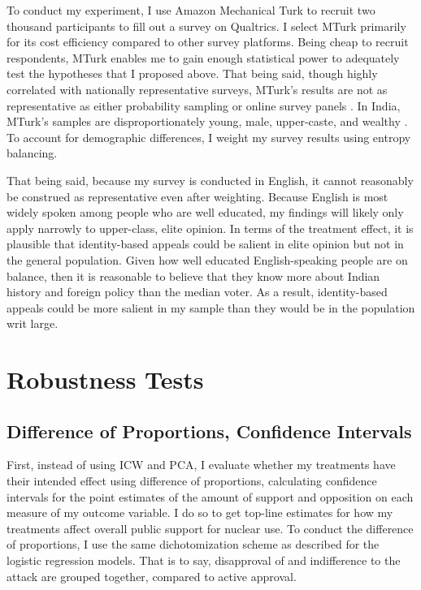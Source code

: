 \documentclass[12pt]{article}
\begin{document}
To conduct my experiment, I use Amazon Mechanical Turk to recruit two thousand participants to fill out a survey on Qualtrics. I select MTurk primarily for its cost efficiency compared to other survey platforms. Being cheap to recruit respondents, MTurk enables me to gain enough statistical power to adequately test the hypotheses that I proposed above. That being said, though highly correlated with nationally representative surveys, MTurk's results are not as representative as either probability sampling or online survey panels \citep{berinsky_evaluating_2012}. In India, MTurk's samples are disproportionately young, male, upper-caste, and wealthy \citep{boas_recruiting_2020}. To account for demographic differences, I weight my survey results using entropy balancing. 

That being said, because my survey is conducted in English, it cannot reasonably be construed as representative even after weighting. Because English is most widely spoken among people who are well educated, my findings will likely only apply narrowly to upper-class, elite opinion. In terms of the treatment effect, it is plausible that identity-based appeals could be salient in elite opinion but not in the general population. Given how well educated English-speaking people are on balance, then it is reasonable to believe that they know more about Indian history and foreign policy than the median voter. As a result, identity-based appeals could be more salient in my sample than they would be in the population writ large.

\section{Robustness Tests}
\subsection{Difference of Proportions, Confidence Intervals}
First, instead of using ICW and PCA, I evaluate whether my treatments have their intended effect using difference of proportions, calculating confidence intervals for the point estimates of the amount of support and opposition on each measure of my outcome variable. I do so to get top-line estimates for how my treatments affect overall public support for nuclear use. To conduct the difference of proportions, I use the same dichotomization scheme as described for the logistic regression models. That is to say, disapproval of and indifference to the attack are grouped together, compared to active approval.
\end{document}

